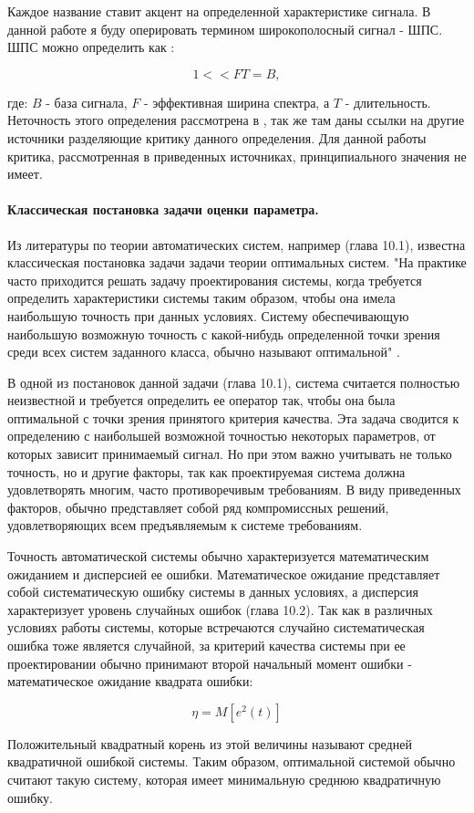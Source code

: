 Каждое название ставит акцент на определенной характеристике сигнала. В данной работе я буду оперировать термином
широкополосный сигнал - ШПС. ШПС можно определить как \cite{gantmaher-book, varakin-book}:
\begin{center}
\begin{equation}
	\label{eq:ss_signal}
	1 << FT = B,
\end{equation}
\end{center}
где: ${B}$ - база сигнала, ${F}$ - эффективная ширина спектра, а ${T}$ - длительность.
Неточность этого определения рассмотрена в \cite{gantmaher-book}, так же там даны ссылки на другие источники
разделяющие критику данного определения. Для данной работы критика, рассмотренная в приведенных источниках,
принципиального значения не имеет.

\paragraph{Классическая постановка задачи оценки параметра.}
Из литературы по теории автоматических систем, например \cite{pugachev} (глава 10.1), известна классическая постановка
задачи задачи теории оптимальных систем. "На практике часто приходится решать задачу проектирования системы, когда
требуется определить характеристики системы таким образом, чтобы она имела наибольшую точность при данных условиях.
Систему обеспечивающую наибольшую возможную точность с какой-нибудь определенной точки зрения среди всех систем
заданного класса, обычно называют оптимальной" \cite{pugachev}.

В одной из постановок данной задачи \cite{pugachev} (глава 10.1), система считается полностью неизвестной
и требуется определить ее оператор так, чтобы она была оптимальной с точки зрения принятого критерия качества. Эта
задача сводится к определению с наибольшей возможной точностью некоторых параметров, от которых зависит принимаемый
сигнал. Но при этом важно учитывать не только точность, но и другие факторы, так как проектируемая система должна
удовлетворять многим, часто противоречивым требованиям. В виду приведенных факторов, обычно представляет собой
ряд компромиссных решений, удовлетворяющих всем предъявляемым к системе требованиям.

Точность автоматической системы обычно характеризуется математическим ожиданием и дисперсией ее ошибки.
Математическое ожидание представляет собой систематическую ошибку системы в данных условиях, а дисперсия
характеризует уровень случайных ошибок \cite{pugachev} (глава 10.2). Так как в различных условиях работы
системы, которые встречаются случайно систематическая ошибка тоже является случайной, за критерий качества
системы при ее проектировании обычно принимают второй начальный момент ошибки - математическое ожидание
квадрата ошибки:
\begin{center}
\begin{equation}
	\label{eq:stat_err_prob}
	\eta = M[e^2(t)]
\end{equation}
\end{center}
Положительный квадратный корень из этой величины называют средней квадратичной ошибкой системы. Таким образом,
оптимальной системой обычно считают такую систему, которая имеет минимальную среднюю квадратичную ошибку.

